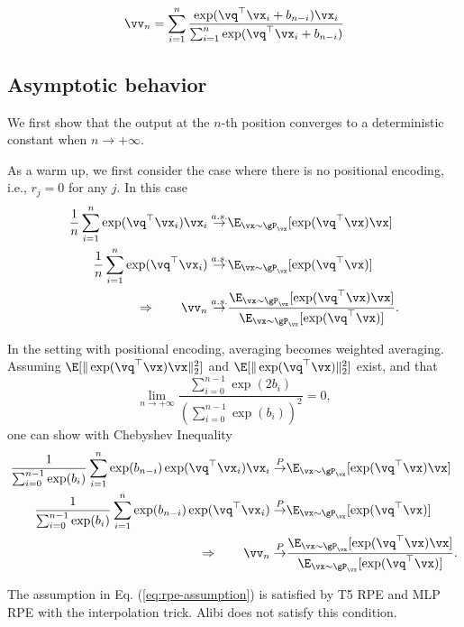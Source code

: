\begin{equation}
    \vv_n=\sum_{i = 1}^n\frac{\exp(\vq^{\top} \vx_i + b_{n-i}) \vx_i}{\sum_{i = 1}^n \exp(\vq^{\top} \vx_i + b_{n-i})}
\end{equation}

\subsection{Asymptotic behavior}
We first show that the output at the $n$-th position converges to a deterministic constant when $n\to +\infty$.

As a warm up, we first consider the case where there is no positional encoding, i.e., $r_j=0$ for any $j$. In this case
\begin{align}
    \frac{1}{n}\sum_{i = 1}^n\exp(\vq^{\top} \vx_i ) \vx_i \overset{a.s.}{\to}& \E_{\vx\sim \gP_{\vx}}[\exp(\vq^{\top} \vx) \vx]\\
    \frac{1}{n}\sum_{i = 1}^n\exp(\vq^{\top} \vx_i) \overset{a.s.}{\to} & \E_{\vx\sim \gP_{\vx}}[\exp(\vq^{\top} \vx)]\\
    \Rightarrow \qquad \vv_n \overset{a.s.}{\to} & \frac{\E_{\vx\sim \gP_{\vx}}[\exp(\vq^{\top} \vx) \vx]}{\E_{\vx\sim \gP_{\vx}}[\exp(\vq^{\top} \vx)]}.
\end{align}

In the setting with positional encoding, averaging becomes weighted averaging. Assuming $\E[\|\exp(\vq^{\top} \vx) \vx\|_2^2]$ and $\E[\|\exp(\vq^{\top} \vx)\|_2^2]$ exist, and that
\begin{equation}\label{eq:rpe-assumption}
    \lim_{n\to+\infty}\frac{\sum_{i=0}^{n-1}\exp(2b_i)}{\left(\sum_{i=0}^{n-1}\exp(b_i)\right)^2}=0,
\end{equation}
one can show with Chebyshev Inequality
\begin{align}
    \frac{1}{\sum_{i=0}^{n-1}\exp(b_i)} \sum_{i = 1}^n \exp(b_{n-i})\exp(\vq^{\top} \vx_i ) \vx_i \overset{P}{\to}& \E_{\vx\sim \gP_{\vx}}[\exp(\vq^{\top} \vx) \vx]\\
    \frac{1}{\sum_{i=0}^{n-1}\exp(b_i)}\sum_{i = 1}^n\exp(b_{n-i})\exp(\vq^{\top} \vx_i)  \overset{P}{\to} & \E_{\vx\sim \gP_{\vx}}[\exp(\vq^{\top} \vx)]\\
    \Rightarrow \qquad \vv_n \overset{P}{\to} & \frac{\E_{\vx\sim \gP_{\vx}}[\exp(\vq^{\top} \vx) \vx]}{\E_{\vx\sim \gP_{\vx}}[\exp(\vq^{\top} \vx)]}.
\end{align}

The assumption in Eq. (\ref{eq:rpe-assumption}) is satisfied by T5 RPE and MLP RPE with the interpolation trick. Alibi does not satisfy this condition.

